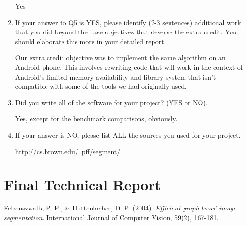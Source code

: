 \documentclass[12pt, english, titlepage]{article}
\begin{document}
\begin{enumerate}
Yes

\item If your answer to Q5 is YES, please identify (2-3 sentences) additional work that you did beyond the base objectives that deserve the extra credit. You should elaborate this more in your detailed report.

Our extra credit objective was to implement the same algorithm on an Android phone. This involves rewriting code that will work in the context of Android's limited memory availability and library system that isn't compatible with some of the tools we had originally used.

\item Did you write all of the software for your project? (YES or NO).

Yes, except for the benchmark comparisons, obviously.

\item If your answer is NO, please list ALL the sources you used for your project.

http://cs.brown.edu/~pff/segment/

\end{enumerate}


\section{Final Technical Report}


\begin{thebibliography}{2}
\small

Felzenszwalb, P. F., \& Huttenlocher, D. P. (2004).
	\emph{Efficient graph-based image segmentation}.
	International Journal of Computer Vision, 59(2), 167-181.

\end{thebibliography}
\end{document}
